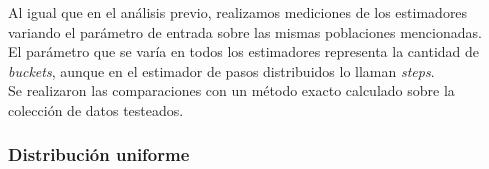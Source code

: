 \quad Al igual que en el an\'alisis previo, realizamos mediciones de los estimadores variando el par\'ametro de entrada sobre las mismas poblaciones mencionadas.\\

\quad El par\'ametro que se var\'ia en todos los estimadores representa la cantidad de \textit{buckets}, aunque en el estimador de pasos distribuidos lo llaman \textit{steps}. \\

\quad Se realizaron las comparaciones con un m\'etodo exacto calculado sobre la colecci\'on de datos testeados.

\subsubsection{Distribuci\'on uniforme}

